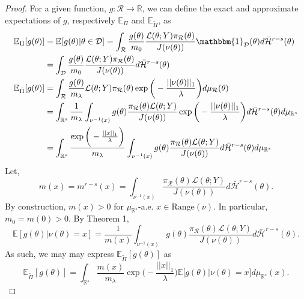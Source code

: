 \documentclass[10pt,fleqn]{article}
\newcommand{\bb}[1]{\mathbb{#1}} \newcommand{\mc}[1]{\mathcal{#1}}
\DeclareMathOperator{\1}{\mathbbm{1}} \DeclareMathOperator{\bigO}{\mc O}
\begin{document}
\begin{proof}
For a given function, $g:\mathcal{R}\to\mathbb{R}$, we can define the exact and approximate expectations of $g$, respectively $\bb E_\Pi$ and $\bb E_{\tilde{\Pi}}$, as
\begin{align*}
\bb E_\Pi[g(\theta)] &= \bb E[g(\theta)|\theta\in\mathcal{D}] = \int_\mathcal{R} \frac{g(\theta)}{m_0} \frac{\mathcal{L}(\theta;Y)\pi_\mathcal{R}(\theta)}{J(\nu(\theta))}\mathbbm{1}_\mathcal{D}(\theta)d\bar{\mathcal{H}}^{r-s}(\theta) \\
&=\int_\mathcal{D} \frac{g(\theta)}{m_0} \frac{\mathcal{L}(\theta;Y)\pi_\mathcal{R}(\theta)}{J(\nu(\theta))}d\bar{\mathcal{H}}^{r-s}(\theta)\\
\bb E_{\tilde{\Pi}}[g(\theta)] &= \int_\mathcal{R}  \frac{g(\theta)}{m_\lambda} \mathcal{L}(\theta;Y)\pi_\mathcal{R}(\theta)\exp\bigg(-\frac{||\nu(\theta)||_1}{\lambda}\bigg)d\mu_\mathcal{R}(\theta) \\
&= \int_{\mathbb{R}^s} \frac{1}{m_\lambda} \int_{\nu^{-1}(x)} g(\theta) \frac{\pi_\mathcal{R}(\theta)\mathcal{L}(\theta;Y)}{J(\nu(\theta))} \exp\bigg(-\frac{||\nu(\theta)||_1}{\lambda}\bigg) d\bar{\mathcal{H}}^{r-s}(\theta) d\mu_{\mathbb{R}^s} \\
&=\int_{\mathbb{R}^s} \frac{\exp\bigg(-\frac{||x||_1}{\lambda}\bigg) }{m_\lambda} \int_{\nu^{-1}(x)} g(\theta) \frac{\pi_\mathcal{R}(\theta)\mathcal{L}(\theta;Y)}{J(\nu(\theta))} d\bar{\mathcal{H}}^{r-s}(\theta) d\mu_{\mathbb{R}^s} 
\end{align*}
Let, $$m(x) = m^{r-s}(x) = \int_{\nu^{-1}(x)}\frac{\pi_\mathcal{R}(\theta)\mathcal{L}(\theta;Y)}{J(\nu(\theta))} d\bar{\mathcal{H}}^{r-s}(\theta) .$$
By construction, $m(x) > 0$ for $\mu_{\mathbb{R}^s}$-a.e. $x\in \text{Range}(\nu)$. In particular, $m_0=m(0)>0$. By Theorem 1,
\begin{equation}
\bb E[g(\theta) | \nu(\theta) = x] = \frac{1}{m(x)} \int_{\nu^{-1}(x)} g(\theta)\frac{\pi_\mathcal{R}(\theta)\mathcal{L}(\theta;Y)}{J(\nu(\theta))} d\bar{\mathcal{H}}^{r-s}(\theta).
\end{equation}
As such, we may may express $\bb E_{\tilde{\Pi}}[g(\theta)]$ as 
\begin{equation}
\bb E_{\tilde{\Pi}}[g(\theta)] = \int_{\mathbb{R}^s} \frac{m(x)}{m_\lambda}\exp\bigg(-\frac{||x||_1}{\lambda}\bigg) \bb E\big[g(\theta)|\nu(\theta)=x\big] d\mu_{\mathbb{R}^s}(x).
\end{equation}


\end{proof}
\end{document}

